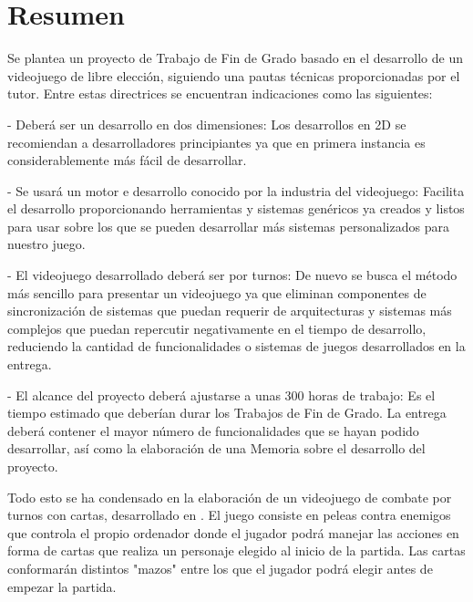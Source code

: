 \chapter*{Resumen}


Se plantea un proyecto de Trabajo de Fin de Grado basado en el desarrollo de un videojuego de libre elección, siguiendo una pautas técnicas proporcionadas por el tutor.
Entre estas directrices se encuentran indicaciones como las siguientes:

- Deberá ser un desarrollo en dos dimensiones: Los desarrollos en 2D se recomiendan a desarrolladores principiantes ya que en primera instancia es considerablemente más fácil de desarrollar.

- Se usará un motor e desarrollo conocido por la industria del videojuego: Facilita el desarrollo proporcionando herramientas y sistemas genéricos ya creados y listos para usar sobre los que se pueden desarrollar más sistemas personalizados para nuestro juego.

- El videojuego desarrollado deberá ser por turnos: De nuevo se busca el método más sencillo para presentar un videojuego ya que eliminan componentes de sincronización de sistemas que puedan requerir de arquitecturas y sistemas más complejos que puedan repercutir negativamente en el tiempo de desarrollo, reduciendo la cantidad de funcionalidades o sistemas de juegos desarrollados en la entrega.

- El alcance del proyecto deberá ajustarse a unas 300 horas de trabajo: Es el tiempo estimado que deberían durar los Trabajos de Fin de Grado. La entrega deberá contener el mayor número de funcionalidades que se hayan podido desarrollar, así como la elaboración de una Memoria sobre el desarrollo del proyecto.

Todo esto se ha condensado en la elaboración de un videojuego de combate por turnos con cartas, desarrollado en .
 El juego consiste en peleas contra enemigos que controla el propio ordenador donde el jugador podrá manejar las acciones en forma de cartas que realiza un personaje elegido al inicio de la partida. Las cartas conformarán distintos "mazos" entre los que el jugador podrá elegir antes de empezar la partida.